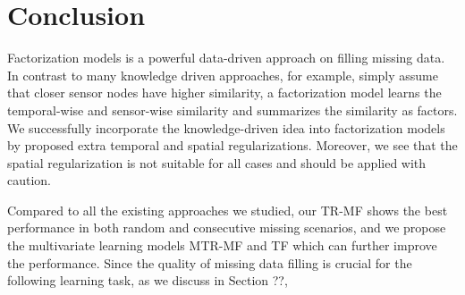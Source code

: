 \section{Conclusion}  \label{sec:conc}
Factorization models is a powerful data-driven approach on filling missing data. In contrast to many knowledge driven approaches, for example, simply assume that closer sensor nodes have higher similarity, a factorization model learns the temporal-wise and sensor-wise similarity and summarizes the similarity as factors. We successfully incorporate the knowledge-driven idea into factorization models by proposed extra temporal and spatial regularizations. Moreover, we see that the spatial regularization is not suitable for all cases and should be applied with caution.  

Compared to all the existing approaches we studied, our TR-MF shows the best performance in both random and consecutive missing scenarios, and we propose the multivariate learning models MTR-MF and TF which can further improve the performance. Since the quality of missing data filling is crucial for the following learning task, as we discuss in Section ??, 
